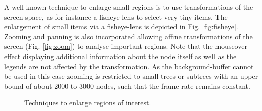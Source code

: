 \begin{itemize}
A well known technique to enlarge small regions is to use transformations of the screen-space, as for instance a fisheye-lens to select very tiny items. The enlargement of small items via a fisheye-lens is depicted in Fig. \ref{fig:fisheye}. Zooming and panning is also incorporated allowing affine transformations of the screen (Fig. \ref{fig:zoom}) to analyse important regions. Note that the mouseover-effect displaying additional information about the node itself as well as the legends are not affected by the transformation. As the background-buffer cannot be used in this case zooming is restricted to small trees or subtrees with an upper bound of about 2000 to 3000 nodes, such that the frame-rate remains constant.

\begin{figure}
\centering
{}
\caption{Techniques to enlarge regions of interest.}
\end{figure}


\end{itemize}

